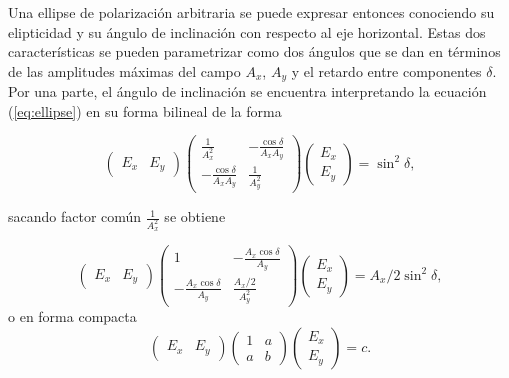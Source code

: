Una ellipse de polarización arbitraria se puede expresar entonces conociendo su
elipticidad y su ángulo de inclinación con respecto al eje
horizontal. Estas dos características se pueden parametrizar como dos
ángulos que se dan en
términos de las amplitudes máximas del campo $A_x$, $A_y$
y el retardo entre componentes $\delta$. Por una parte, el ángulo de
inclinación se encuentra interpretando la ecuación (\ref{eq:ellipse}) en
su forma bilineal de la forma

\begin{equation}
\begin{pmatrix}
E_x & E_y
\end{pmatrix}
\begin{pmatrix}
\frac{1}{A_x^2} & -\frac{\cos{\delta}}{A_xA_y}\\
 -\frac{\cos{\delta}}{A_xA_y} & \frac{1}{A_y^2} 
\end{pmatrix}
\begin{pmatrix}
E_x \\ E_y
\end{pmatrix}
=\sin^2{\delta},
\end{equation}

sacando factor común $\frac{1}{A_x^2} $ se obtiene

\begin{equation}
\begin{pmatrix}
E_x & E_y
\end{pmatrix}
\begin{pmatrix}
1 & -\frac{A_x\cos{\delta}}{A_y}\\
 -\frac{A_x\cos{\delta}}{A_y} & \frac{A_x/2}{A_y^2} 
\end{pmatrix}
\begin{pmatrix}
E_x \\ E_y
\end{pmatrix}
=A_x/2\sin^2{\delta},
\end{equation}
o en forma compacta
\begin{equation}
\begin{pmatrix}
E_x & E_y
\end{pmatrix}
\begin{pmatrix}
1 & a\\
 a & b 
\end{pmatrix}
\begin{pmatrix}
E_x \\ E_y
\end{pmatrix}
=c.
\end{equation}

